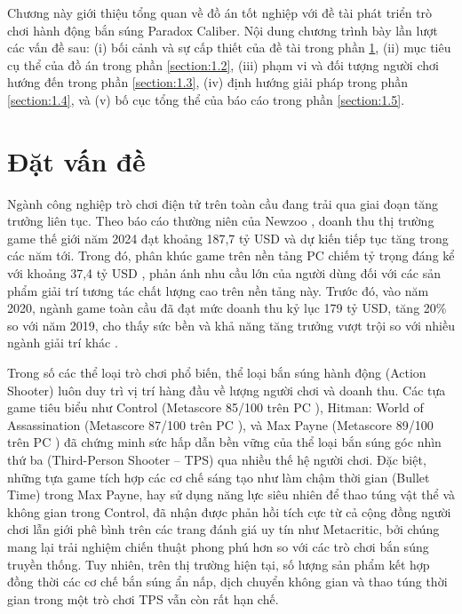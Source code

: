 \documentclass[../DoAn.tex]{subfiles}
\begin{document}
Chương này giới thiệu tổng quan về đồ án tốt nghiệp với đề tài phát triển trò chơi hành động bắn súng Paradox Caliber. Nội dung chương trình bày lần lượt các vấn đề sau: (i) bối cảnh và sự cấp thiết của đề tài trong phần \ref{section:1.1}, (ii) mục tiêu cụ thể của đồ án trong phần \ref{section:1.2}, (iii) phạm vi và đối tượng người chơi hướng đến trong phần \ref{section:1.3}, (iv) định hướng giải pháp trong phần \ref{section:1.4}, và (v) bố cục tổng thể của báo cáo trong phần \ref{section:1.5}.

\section{Đặt vấn đề}
\label{section:1.1}

Ngành công nghiệp trò chơi điện tử trên toàn cầu đang trải qua giai đoạn tăng trưởng liên tục. Theo báo cáo thường niên của Newzoo \cite{Newzoo2024}, doanh thu thị trường game thế giới năm 2024 đạt khoảng 187,7 tỷ USD và dự kiến tiếp tục tăng trong các năm tới. Trong đó, phân khúc game trên nền tảng PC chiếm tỷ trọng đáng kể với khoảng 37,4 tỷ USD \cite{Newzoo2024}, phản ánh nhu cầu lớn của người dùng đối với các sản phẩm giải trí tương tác chất lượng cao trên nền tảng này. Trước đó, vào năm 2020, ngành game toàn cầu đã đạt mức doanh thu kỷ lục 179 tỷ USD, tăng 20\% so với năm 2019, cho thấy sức bền và khả năng tăng trưởng vượt trội so với nhiều ngành giải trí khác \cite{Witkowski2020}.

Trong số các thể loại trò chơi phổ biến, thể loại bắn súng hành động (Action Shooter) luôn duy trì vị trí hàng đầu về lượng người chơi và doanh thu. Các tựa game tiêu biểu như Control (Metascore 85/100 trên PC \cite{MetacriticControl}), Hitman: World of Assassination (Metascore 87/100 trên PC \cite{MetacriticHitman3}), và Max Payne (Metascore 89/100 trên PC \cite{MetacriticMaxPayne}) đã chứng minh sức hấp dẫn bền vững của thể loại bắn súng góc nhìn thứ ba (Third-Person Shooter -- TPS) qua nhiều thế hệ người chơi. Đặc biệt, những tựa game tích hợp các cơ chế sáng tạo như làm chậm thời gian (Bullet Time) trong Max Payne, hay sử dụng năng lực siêu nhiên để thao túng vật thể và không gian trong Control, đã nhận được phản hồi tích cực từ cả cộng đồng người chơi lẫn giới phê bình trên các trang đánh giá uy tín như Metacritic, bởi chúng mang lại trải nghiệm chiến thuật phong phú hơn so với các trò chơi bắn súng truyền thống. Tuy nhiên, trên thị trường hiện tại, số lượng sản phẩm kết hợp đồng thời các cơ chế bắn súng ẩn nấp, dịch chuyển không gian và thao túng thời gian trong một trò chơi TPS vẫn còn rất hạn chế.
\end{document}
